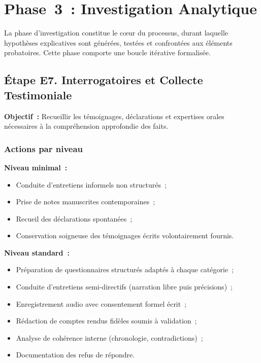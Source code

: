 \section{Phase~3~: Investigation Analytique}
\label{sec:piu-phase3}

La phase d'investigation constitue le c\oe ur du processus, durant laquelle
hypothèses explicatives sont générées, testées et confrontées aux éléments
probatoires. Cette phase comporte une boucle itérative formalisée.

\subsection{Étape E7. Interrogatoires et Collecte Testimoniale}

\textbf{Objectif~:} Recueillir les témoignages, déclarations et expertises orales
nécessaires à la compréhension approfondie des faits.

\subsubsection*{Actions par niveau}

\textbf{Niveau minimal~:}
\begin{itemize}
    \item Conduite d'entretiens informels non structurés~;
    \item Prise de notes manuscrites contemporaines~;
    \item Recueil des déclarations spontanées~;
    \item Conservation soigneuse des témoignages écrits volontairement fournis.
\end{itemize}

\textbf{Niveau standard~:}
\begin{itemize}
    \item Préparation de questionnaires structurés adaptés à chaque catégorie~;
    \item Conduite d'entretiens semi-directifs (narration libre puis précisions)~;
    \item Enregistrement audio avec consentement formel écrit~;
    \item Rédaction de comptes rendus fidèles soumis à validation~;
    \item Analyse de cohérence interne (chronologie, contradictions)~;
    \item Documentation des refus de répondre.
\end{itemize}

